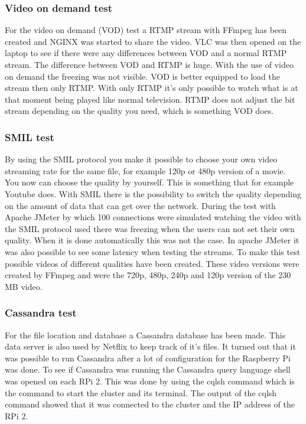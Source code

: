 \documentclass{sig-alternate-br}
\begin{document}
\subsubsection{Video on demand test}
For the video on demand (VOD) test a RTMP stream with FFmpeg has been created and NGINX was started to share the video. VLC was then opened on the laptop to see if there were any differences between VOD and a normal RTMP stream. The difference between VOD and RTMP is huge. With the use of video on demand the freezing was not visible. VOD is better equipped to load the stream then only RTMP. With only RTMP it's only possible to watch what is at that moment being played like normal television. RTMP does not adjust the bit stream depending on the quality you need, which is something VOD does.

\subsubsection{SMIL test}
By using the SMIL protocol you make it possible to choose your own video streaming rate for the same file, for example 120p or 480p version of a movie. You now can choose the quality by yourself. This is something that for example Youtube does. With SMIL there is the possibility to switch the quality depending on the amount of data that can get over the network. During the test with Apache JMeter by which 100 connections were simulated watching the video with the SMIL protocol used there was freezing when the users can not set their own quality. When it is done automatically this was not the case. In apache JMeter it was also possible to see some latency when testing the streams. To make this test possible videos of different qualities have been created. These video versions were created by FFmpeg and were the 720p, 480p, 240p and 120p version of the 230 MB video. 

\subsubsection{Cassandra test}
For the file location and database a Cassandra database has been made. This data server is also used by Netflix to keep track of it's files. It turned out that it was possible to run Cassandra after a lot of configuration for the Raspberry Pi was done. To see if Cassandra was running the Cassandra query language shell was  opened on each RPi 2. This was done by using the cqlsh command which is the command to start the cluster and its terminal. The output of the cqlsh command showed that it was connected to the cluster and the IP address of the RPi 2. 
\end{document}
